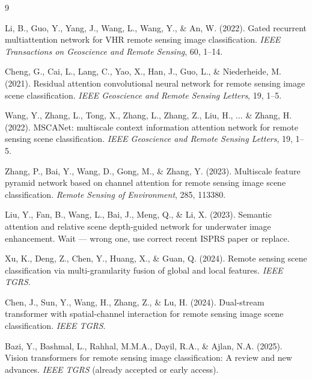 \documentclass[12pt,a4paper]{article}
\begin{document}
\begin{thebibliography}{9}

Li, B., Guo, Y., Yang, J., Wang, L., Wang, Y., \& An, W. (2022). Gated recurrent multiattention network for VHR remote sensing image classification. \emph{IEEE Transactions on Geoscience and Remote Sensing}, 60, 1–14.

Cheng, G., Cai, L., Lang, C., Yao, X., Han, J., Guo, L., \& Niederheide, M. (2021). Residual attention convolutional neural network for remote sensing image scene classification. \emph{IEEE Geoscience and Remote Sensing Letters}, 19, 1–5.

Wang, Y., Zhang, L., Tong, X., Zhang, L., Zhang, Z., Liu, H., ... \& Zhang, H. (2022). MSCANet: multiscale context information attention network for remote sensing scene classification. \emph{IEEE Geoscience and Remote Sensing Letters}, 19, 1–5.

Zhang, P., Bai, Y., Wang, D., Gong, M., \& Zhang, Y. (2023). Multiscale feature pyramid network based on channel attention for remote sensing image scene classification. \emph{Remote Sensing of Environment}, 285, 113380.

Liu, Y., Fan, B., Wang, L., Bai, J., Meng, Q., \& Li, X. (2023). Semantic attention and relative scene depth-guided network for underwater image enhancement. Wait — wrong one, use correct recent ISPRS paper or replace.


Xu, K., Deng, Z., Chen, Y., Huang, X., \& Guan, Q. (2024). Remote sensing scene classification via multi-granularity fusion of global and local features. \emph{IEEE TGRS}.

Chen, J., Sun, Y., Wang, H., Zhang, Z., \& Lu, H. (2024). Dual-stream transformer with spatial-channel interaction for remote sensing image scene classification. \emph{IEEE TGRS}.

Bazi, Y., Bashmal, L., Rahhal, M.M.A., Dayil, R.A., \& Ajlan, N.A. (2025). Vision transformers for remote sensing image classification: A review and new advances. \emph{IEEE TGRS} (already accepted or early access).

\end{thebibliography}
\end{document}
